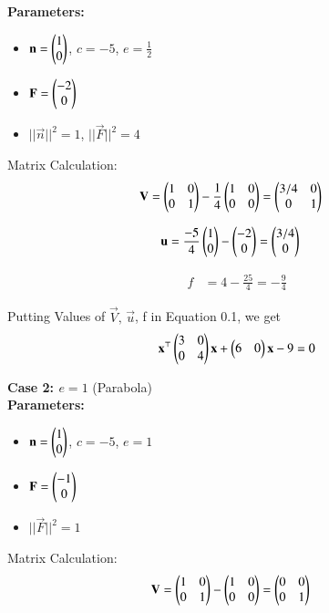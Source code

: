 \documentclass[journal]{IEEEtran}
\begin{document}
\textbf{Parameters:}
\begin{itemize}
\item $\mathbf{n} = \begin{pmatrix}1 \\ 0\end{pmatrix}$, $c = -5$, $e = \frac{1}{2}$
\item $\mathbf{F} = \begin{pmatrix}-2 \\ 0\end{pmatrix}$
\item $||\vec{n}||^2 = 1$, $||\vec{F}||^2 = 4$
\end{itemize}

Matrix Calculation:\\
\begin{align}
\mathbf{V} &= \begin{pmatrix}1 & 0 \\ 0 & 1\end{pmatrix} - \frac{1}{4}\begin{pmatrix}1 & 0 \\ 0 & 0\end{pmatrix} = \begin{pmatrix}3/4 & 0 \\ 0 & 1\end{pmatrix}
\end{align}

\begin{align}
\mathbf{u} &= \frac{-5}{4}\begin{pmatrix}1 \\ 0\end{pmatrix} - \begin{pmatrix}-2 \\ 0\end{pmatrix} = \begin{pmatrix}3/4 \\ 0\end{pmatrix}
\end{align}

\begin{align}
f &= 4 - \frac{25}{4} = -\frac{9}{4}
\end{align}

\bigskip

Putting Values of $\vec{V}, \, \vec{u}$, f in Equation 0.1, we get
\begin{equation}
\mathbf{x}^\top\begin{pmatrix}3 & 0 \\ 0 & 4\end{pmatrix}\mathbf{x} + \begin{pmatrix}6 & 0\end{pmatrix}\mathbf{x} - 9 = 0
\end{equation}



\newpage

\textbf{Case 2: $e = 1$} (Parabola)\\
\textbf{Parameters:}
\begin{itemize}
\item $\mathbf{n} = \begin{pmatrix}1 \\ 0\end{pmatrix}$, $c = -5$, $e = 1$
\item $\mathbf{F} = \begin{pmatrix}-1 \\ 0\end{pmatrix}$
\item $||\vec{F}||^2 = 1$
\end{itemize}

\bigskip

Matrix Calculation:
\begin{align}
\mathbf{V} &= \begin{pmatrix}1 & 0 \\ 0 & 1\end{pmatrix} - \begin{pmatrix}1 & 0 \\ 0 & 0\end{pmatrix} = \begin{pmatrix}0 & 0 \\ 0 & 1\end{pmatrix}
\end{align}
\end{document}
